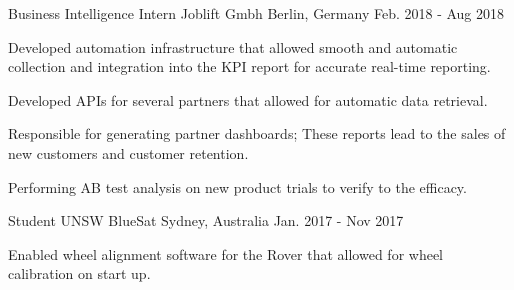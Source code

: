 \begin{cventries}
  \cventry
    {Business Intelligence Intern} %
    {Joblift Gmbh} %
    {Berlin, Germany} %
    {Feb. 2018 - Aug 2018} %
    {
      \begin{cvitems} %
        \item {Developed automation infrastructure that allowed smooth and automatic collection and integration into the KPI report for accurate real-time reporting.}
        \item {Developed APIs for several partners that allowed for automatic data retrieval.}
        \item {Responsible for generating partner dashboards; These reports lead to the sales of new customers and customer retention.}
        \item {Performing AB test analysis on new product trials to verify to the efficacy.}
      \end{cvitems}
    }

  \cventry
    {Student} %
    {UNSW BlueSat} %
    {Sydney, Australia} %
    {Jan. 2017 - Nov 2017} %
    {
      \begin{cvitems} %
        \item {Enabled wheel alignment software for the Rover that allowed for wheel calibration on start up.}
      \end{cvitems}
    }


\end{cventries}
